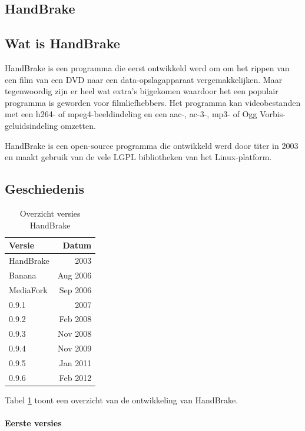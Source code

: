 \documentclass[12pt,a4paper]{article}
\begin{document}
\begin{titlepage}
\begin{center}
\pagebreak

\section{HandBrake}
\subsection{Wat is HandBrake}
HandBrake is een programma die eerst ontwikkeld werd om om het rippen van een film van een DVD naar een data-opslagapparaat vergemakkelijken. Maar tegenwoordig zijn er heel wat extra's bijgekomen waardoor het een populair programma is geworden voor filmliefhebbers. Het programma kan videobestanden met een h264- of mpeg4-beeldindeling en een aac-, ac-3-, mp3- of Ogg Vorbis-geluidsindeling omzetten.

HandBrake is een open-source programma die  ontwikkeld werd door titer in 2003 en maakt gebruik van de vele LGPL bibliotheken van het Linux-platform.
\subsection{Geschiedenis}
\begin{table}[h!b!p!]
\caption{Overzicht versies HandBrake \label{HandBrakeversies}}
\begin{center}
\begin{tabular}{|l|r|}
\hline
Versie & Datum\\\hline
HandBrake & 2003 \\
Banana & Aug 2006 \\
MediaFork & Sep 2006 \\
0.9.1 & 2007 \\
0.9.2 & Feb 2008 \\
0.9.3 & Nov 2008 \\
0.9.4 & Nov 2009 \\
0.9.5 & Jan 2011 \\
0.9.6 & Feb 2012\\
\hline
\end{tabular}
\end{center}
\end{table}

Tabel \ref{HandBrakeversies} toont een overzicht van de ontwikkeling van HandBrake. 

\paragraph{Eerste versies}


\end{center}
\end{titlepage}
\end{document}
